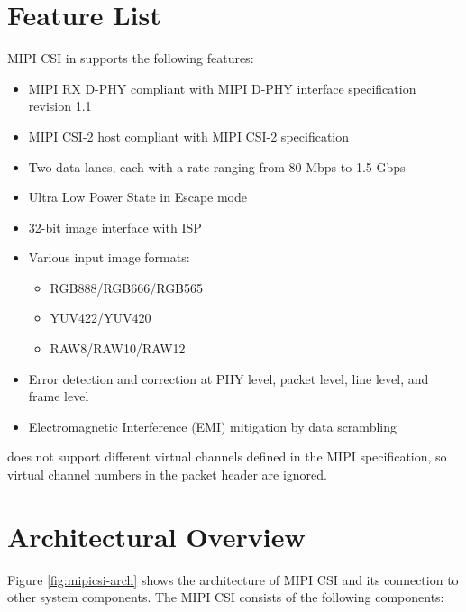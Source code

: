 \documentclass[main\_\_EN.tex]{subfiles}
\begin{document}

\section{Feature List}
\label{sec:mipicsi-features}

MIPI CSI in \chipname{} supports the following features:

\begin{itemize}
    \item MIPI RX D-PHY compliant with MIPI D-PHY interface specification revision 1.1
    \item MIPI CSI-2 host compliant with MIPI CSI-2 specification
    \item Two data lanes, each with a rate ranging from 80 Mbps to 1.5 Gbps
    \item Ultra Low Power State in Escape mode
    \item 32-bit image interface with ISP
    \item Various input image formats:
        \begin{itemize}
            \item RGB888/RGB666/RGB565
            \item YUV422/YUV420
            \item RAW8/RAW10/RAW12
        \end{itemize}
    \item Error detection and correction at PHY level, packet level, line level, and frame level
    \item Electromagnetic Interference (EMI) mitigation by data scrambling
\end{itemize}

\begin{tiplisting}
\chipname{} does not support different virtual channels defined in the MIPI specification, so virtual channel numbers in the packet header are ignored.
\end{tiplisting}



\section{Architectural Overview}
\label{sec:mipicsi-arch-overview}

Figure \ref{fig:mipicsi-arch} shows the architecture of MIPI CSI and its connection to other system components. The MIPI CSI consists of the following components:
\end{document}
